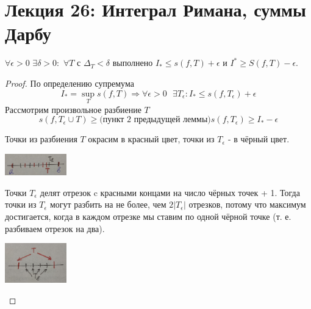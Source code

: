     \section*{Лекция 26: Интеграл Римана, суммы Дарбу}
    
    \begin{lemma}
    	$\forall \epsilon > 0$ $\exists \delta > 0:$ $\forall T$ с $\Delta_T < \delta$ выполнено $I_{*} \leqslant s(f, T) + \epsilon$ и $I^{*} \geqslant S(f, T) - \epsilon$.
    \end{lemma}
    
    \begin{proof}
    	По определению супремума
    	\[ I_{*} = \sup_T{s(f, T)} \Rightarrow \forall \epsilon > 0 \text{ } \exists T_{\epsilon} : I_{*} \leqslant s(f, T_{\epsilon}) + \epsilon \]
    	Рассмотрим произвольное разбиение $T$
    	\[ s(f, T_{\epsilon} \cup T) \geqslant \text{(пункт 2 предыдущей леммы)} s(f, T_{\epsilon}) \geqslant I_{*} - \epsilon \]
    	
    	Точки из разбиения $T$ окрасим в красный цвет, точки из $T_{\epsilon}$ - в чёрный цвет.
    	
    	\begin{center}
    		\includegraphics[width=0.2\textwidth]{img/lecture26/coloring_segments}
    	\end{center}
    	
    	Точки $T_{\epsilon}$ делят отрезок c красными концами на число чёрных точек + 1. Тогда точки из $T_{\epsilon}$ могут разбить на не более, чем $2|T_{\epsilon}|$ отрезков, потому что максимум достигается, когда в каждом отрезке мы ставим по одной чёрной точке (т. е. разбиваем отрезок на два).
    	
    	\begin{center}
    		\includegraphics[width=0.2\textwidth]{img/lecture26/segment_number_estimation}
    	\end{center}
    	

\end{proof}

